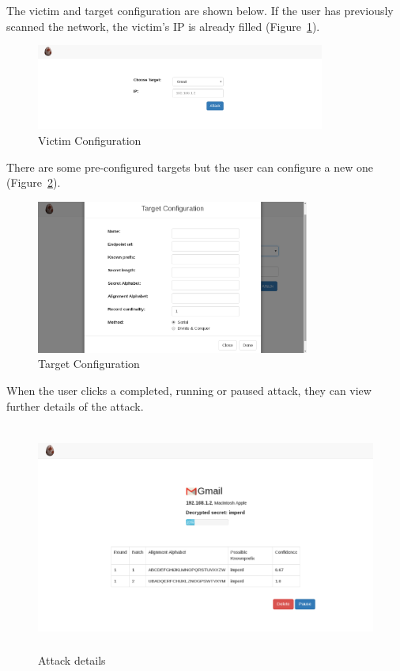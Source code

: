 \documentclass[a4paper, 11 pt, conference]{article}
\begin{document}
The victim and target configuration are shown below. If the user has previously scanned the network, the victim's IP is already filled (Figure~\ref{fig:victim}).

\begin{figure}[thpb]
	\centering
	\includegraphics[width=95mm]{figures/victim.png}
	\caption{Victim Configuration}
	\label{fig:victim}
\end{figure}

There are some pre-configured targets but the user can configure a new one (Figure~\ref{fig:target}).


\begin{figure}[thpb]
	\centering
	\includegraphics[width=90mm]{figures/target.png}
	\caption{Target Configuration}
	\label{fig:target}
\end{figure}

When the user clicks a completed, running or paused attack, they can view further details of the attack.

\begin{figure}[thpb]
	\centering
	\includegraphics[width=115mm, height=75mm]{figures/attack.png}
	\caption{Attack details}
\end{figure}
\end{document}
